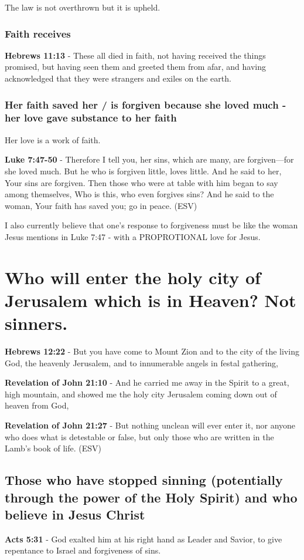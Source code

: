 \documentclass[11pt]{article}
\begin{document}
The law is not overthrown but it is upheld.

\subsubsection{Faith receives}
\label{sec:orga736c97}
\textbf{Hebrews 11:13} - These all died in faith, not having received the things promised, but having seen them and greeted them from afar, and having acknowledged that they were strangers and exiles on the earth.

\subsubsection{Her faith saved her / is forgiven because she loved much - her love gave substance to her faith}
\label{sec:org7938556}
Her love is a work of faith.

\textbf{Luke 7:47-50} -  Therefore I tell you, her sins, which are many, are forgiven—for she loved much.  But he who is forgiven little, loves little.  And he said to her, Your sins are forgiven.  Then those who were at table with him began to say among themselves, Who is this, who even forgives sins?  And he said to the woman, Your faith has saved you; go in peace.  (ESV)

I also currently believe that one's response to forgiveness must be like the woman Jesus mentions in Luke 7:47 - with a PROPROTIONAL love for Jesus.

\section{Who will enter the holy city of Jerusalem which is in Heaven? Not sinners.}
\label{sec:org271749d}
\textbf{Hebrews 12:22} - But you have come to Mount Zion and to the city of the living God, the heavenly Jerusalem, and to innumerable angels in festal gathering,

\textbf{Revelation of John 21:10} - And he carried me away in the Spirit to a great, high mountain, and showed me the holy city Jerusalem coming down out of heaven from God,

\textbf{Revelation of John 21:27} -  But nothing unclean will ever enter it, nor anyone who does what is detestable or false, but only those who are written in the Lamb's book of life.  (ESV)

\subsection{Those who have stopped sinning (potentially through the power of the Holy Spirit) and who believe in Jesus Christ}
\label{sec:org496b283}
\textbf{Acts 5:31} - God exalted him at his right hand as Leader and Savior, to give repentance to Israel and forgiveness of sins.
\end{document}
